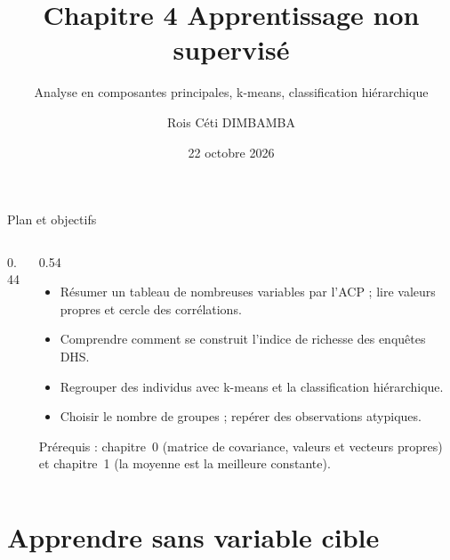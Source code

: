 \documentclass[aspectratio=169,11pt]{beamer}
\title{Chapitre 4 \textendash{} Apprentissage non supervisé}
\subtitle{Analyse en composantes principales, k-means, classification hiérarchique}
\author{Rois Céti DIMBAMBA}
\institute{Ingénieur statisticien économiste \textperiodcentered{} Actuaire \textperiodcentered{} \href{https://rdimbamba.shinyapps.io/roisceti_e-cv/}{\textcolor{cnfVert}{CV en ligne}}}
\date{22 octobre 2026}
\begin{document}
\begin{frame}
  \titlepage
\end{frame}

\begin{frame}{Plan et objectifs}
  \begin{columns}[T]
    \begin{column}{0.44\textwidth}
      \footnotesize\tableofcontents
    \end{column}
    \begin{column}{0.54\textwidth}
      \begin{objectifs}
        \footnotesize
        \begin{itemize}
          \item Résumer un tableau de nombreuses variables par l'ACP ; lire valeurs propres et cercle des corrélations.
          \item Comprendre comment se construit l'indice de richesse des enquêtes DHS.
          \item Regrouper des individus avec k-means et la classification hiérarchique.
          \item Choisir le nombre de groupes ; repérer des observations atypiques.
        \end{itemize}
      \end{objectifs}
      \vskip-1mm{\scriptsize\color{cnfGris}Prérequis : chapitre~0 (matrice de covariance, valeurs et vecteurs propres) et chapitre~1 (la moyenne est la meilleure constante).}
    \end{column}
  \end{columns}
\end{frame}

\section{Apprendre sans variable cible}
\end{document}
